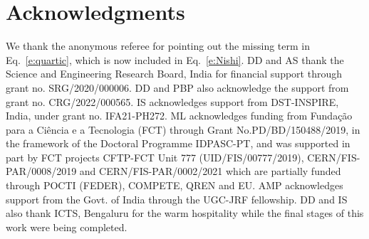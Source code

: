 \documentclass[11pt]{article}
\begin{document}
\section*{Acknowledgments}
%
We thank the anonymous referee for pointing out the missing term in Eq.~\eqref{e:quartic}, which is now included in Eq.~\eqref{e:Nishi}.
%
DD and AS thank the Science and Engineering Research Board, India for financial support through grant no.  SRG/2020/000006. 
%
DD and PBP also acknowledge the support from grant no. CRG/2022/000565.
%
IS acknowledges support from DST-INSPIRE, India, under grant no. IFA21-PH272.
%
ML acknowledges funding from Funda\c{c}\~{a}o para a Ci\^{e}ncia e a 
Tecnologia (FCT) through Grant No.PD/BD/150488/2019, in the 
framework of the Doctoral Programme IDPASC-PT, and was supported 
in part by FCT projects CFTP-FCT Unit 777 (UID/FIS/00777/2019), 
CERN/FIS-PAR/0008/2019 and CERN/FIS-PAR/0002/2021 which are 
partially funded through POCTI (FEDER), COMPETE, QREN and EU.
%
AMP acknowledges support from the Govt. of India through the UGC-JRF fellowship.
%
DD and IS also thank ICTS, Bengaluru for the warm hospitality
while the final stages of this work were being completed.
%
%
\appendix 
\end{document}
